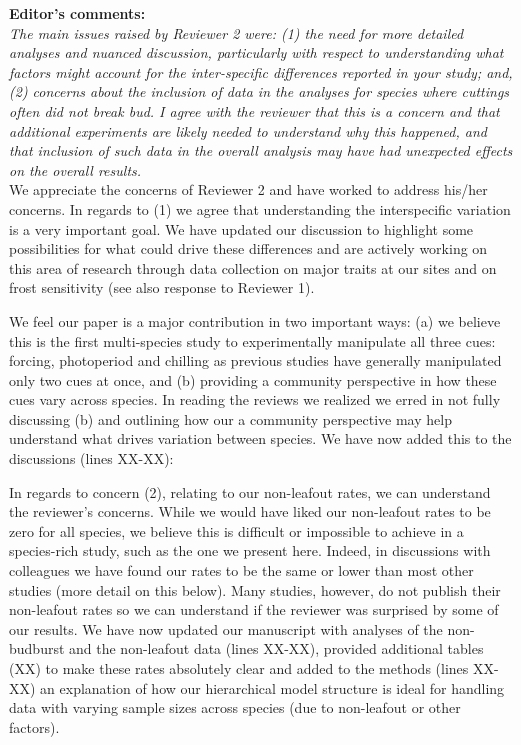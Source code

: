 \documentclass[11pt,a4paper]{article}
\begin{document}


{\bf Editor's comments:} \\
\emph{The main issues raised by Reviewer 2 were: (1) the need for more detailed analyses and
nuanced discussion, particularly with respect to understanding what factors might account for
the inter-specific differences reported in your study; and, (2) concerns about the inclusion
of data in the analyses for species where cuttings often did not break bud.  I agree with the
reviewer that this is a concern and that additional experiments are likely needed to
understand why this happened, and that inclusion of such data in the overall analysis may
have had unexpected effects on the overall results.}\\

We appreciate the concerns of Reviewer 2 and have worked to address his/her concerns. In regards to (1) we agree that understanding the interspecific variation is a very important goal. We have updated our discussion to highlight some possibilities for what could drive these differences and are  actively working on this area of research through data collection on major traits at our sites and on frost sensitivity (see also response to Reviewer 1). 

We feel our paper is a major contribution in two important ways: (a) we believe this is the first multi-species study to experimentally manipulate all three cues: forcing, photoperiod and chilling as previous studies have generally manipulated only two cues at once, and (b) providing a community perspective in how these cues vary across species. In reading the reviews we realized we erred in not fully discussing (b) and outlining how our a community perspective may help understand what drives variation between species. We have now added this to the discussions (lines XX-XX):

\begin{quote}
\end{quote}

In regards to concern (2), relating to our non-leafout rates, we can understand the reviewer's concerns. While we would have liked our non-leafout rates to be zero for all species, we believe this is difficult or impossible to achieve in a species-rich study, such as the one we present here. Indeed, in discussions with colleagues we have found our rates to be the same or lower than most other studies (more detail on this below). Many studies, however, do not publish their non-leafout rates so we can understand if the reviewer was surprised by some of our results. We have now updated our manuscript with analyses of the non-budburst and the non-leafout data (lines XX-XX), provided additional tables (XX) to make these rates absolutely clear and added to the methods (lines XX-XX) an explanation of how our hierarchical model structure is ideal for handling data with varying sample sizes across species (due to non-leafout or other factors). 
\end{document}
